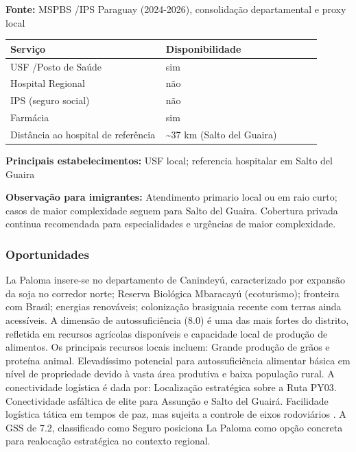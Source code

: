 \textbf{Fonte:} MSPBS /\allowbreak  IPS Paraguay (2024-2026), consolidação
departamental e proxy local

{\def\LTcaptype{none} %
\begin{longtable}{@{}>{\raggedright\arraybackslash}p{0.45\linewidth} >{\raggedright\arraybackslash}p{0.45\linewidth}@{}}
\toprule\noalign{}
Serviço & Disponibilidade \\
\midrule\noalign{}
\endhead
\bottomrule\noalign{}
\endlastfoot
USF /\allowbreak  Posto de Saúde & sim \\
Hospital Regional & não \\
IPS (seguro social) & não \\
Farmácia & sim \\
Distância ao hospital de referência & \textasciitilde37 km (Salto del
Guaira) \\
\end{longtable}
}

\textbf{Principais estabelecimentos:} USF local; referencia hospitalar
em Salto del Guaira

\textbf{Observação para imigrantes:} Atendimento primario local ou em
raio curto; casos de maior complexidade seguem para Salto del Guaira.
Cobertura privada continua recomendada para especialidades e urgências
de maior complexidade.
\newpage

\subsubsection*{Oportunidades}\label{oport-la-paloma-1412}
La Paloma insere-se no departamento de Canindeyú, caracterizado por expansão da soja no corredor norte; Reserva Biológica Mbaracayú (ecoturismo); fronteira com Brasil; energias renováveis; colonização brasiguaia recente com terras ainda acessíveis. A dimensão de autossuficiência (8.0) é uma das mais fortes do distrito, refletida em recursos agrícolas disponíveis e capacidade local de produção de alimentos. Os principais recursos locais incluem: Grande produção de grãos e proteína animal. Elevadíssimo potencial para autossuficiência alimentar básica em nível de propriedade devido à vasta área produtiva e baixa população rural. A conectividade logística é dada por: Localização estratégica sobre a Ruta PY03. Conectividade asfáltica de elite para Assunção e Salto del Guairá. Facilidade logística tática em tempos de paz, mas sujeita a controle de eixos rodoviários . A GSS de 7.2, classificado como Seguro posiciona La Paloma como opção concreta para realocação estratégica no contexto regional.

